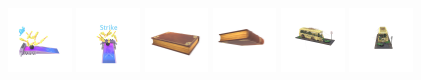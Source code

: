 \begin{figure}[htbp]
  \includegraphics[width=0.15\textwidth]{images/data/samples/10.1.jpeg}\hspace{0.01\textwidth}%
  \includegraphics[width=0.15\textwidth]{images/data/samples/10.2.jpeg}\hfill
  \includegraphics[width=0.15\textwidth]{images/data/samples/11.1.jpeg}\hspace{0.01\textwidth}%
  \includegraphics[width=0.15\textwidth]{images/data/samples/11.2.jpeg}\hfill
  \includegraphics[width=0.15\textwidth]{images/data/samples/12.1.jpeg}\hspace{0.01\textwidth}%
  \includegraphics[width=0.15\textwidth]{images/data/samples/12.2.jpeg}\\\\
  \vspace{2mm}


\end{figure}
